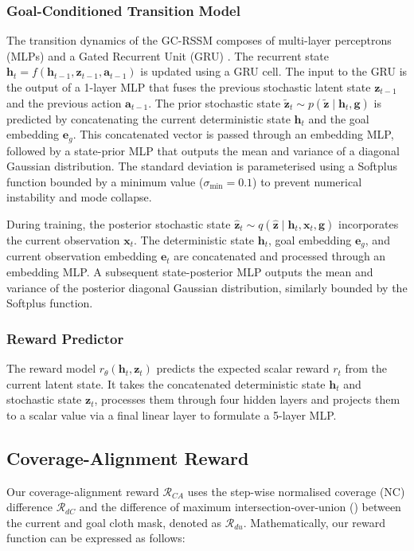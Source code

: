 \documentclass[journal]{IEEEtran}
\begin{document}
\subsubsection{Goal-Conditioned Transition Model} The transition dynamics of the GC-RSSM composes of multi-layer perceptrons (MLPs) and a Gated Recurrent Unit (GRU) \cite{cho2014properties}. The recurrent state $\bm{h}_t = f(\bm{h}_{t-1}, \bm{z}_{t-1}, \bm{a}_{t-1})$ is updated using a GRU cell. The input to the GRU is the output of a 1-layer MLP that fuses the previous stochastic latent state $\bm{z}_{t-1}$ and the previous action $\bm{a}_{t-1}$. The prior stochastic state $\tilde{\bm{z}}_t \sim p(\tilde{\bm{z}} \;|\; \bm{h}_t, \bm{g})$ is predicted by concatenating the current deterministic state $\bm{h}_t$ and the goal embedding $\bm{e}_g$. This concatenated vector is passed through an embedding MLP, followed by a state-prior MLP that outputs the mean and variance of a diagonal Gaussian distribution. The standard deviation is parameterised using a Softplus function bounded by a minimum value ($\sigma_{\text{min}} = 0.1$) to prevent numerical instability and mode collapse.

During training, the posterior stochastic state $\hat{\bm{z}}_t \sim q(\hat{\bm{z}} \;|\; \bm{h}_t, \bm{x}_t, \bm{g})$ incorporates the current observation $\bm{x}_t$. The deterministic state $\bm{h}_t$, goal embedding $\bm{e}_g$, and current observation embedding $\bm{e}_t$ are concatenated and processed through an embedding MLP. A subsequent state-posterior MLP outputs the mean and variance of the posterior diagonal Gaussian distribution, similarly bounded by the Softplus function.

\subsubsection{Reward Predictor} The reward model $r_\theta(\bm{h}_t, \bm{z}_t)$ predicts the expected scalar reward $r_t$ from the current latent state. It takes the concatenated deterministic state $\bm{h}_t$ and stochastic state $\bm{z}_t$, processes them through four hidden layers and projects them to a scalar value via a final linear layer to formulate a 5-layer MLP.

\subsection{Coverage-Alignment Reward}  \label{sec:ca-reward}

Our coverage-alignment reward $\mathcal{R}_{CA}$  uses the step-wise normalised coverage (NC) difference $\mathcal{R}_{dC}$ and the difference of maximum intersection-over-union () between the current and goal cloth mask, denoted as $\mathcal{R}_{du}$. Mathematically, our reward function can be expressed as follows: 
\end{document}
